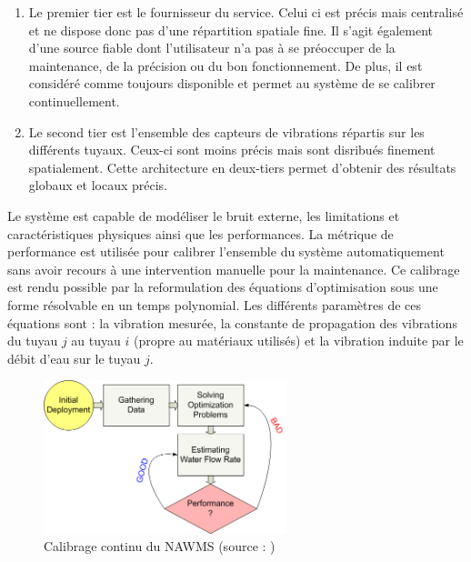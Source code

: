 \documentclass[10pt, article]{llncs}
\begin{document}
		\begin{enumerate}
			\item Le premier tier est le fournisseur du service. Celui ci est précis mais centralisé et ne dispose donc pas d'une répartition spatiale fine. Il s'agit également d'une source fiable dont l'utilisateur n'a pas à se préoccuper de la maintenance, de la précision ou du bon fonctionnement. De plus, il est considéré comme toujours disponible et permet au système de se calibrer continuellement.
			\item Le second tier est l'ensemble des capteurs de vibrations répartis sur les différents tuyaux. Ceux-ci sont moins précis mais sont disribués finement spatialement. Cette architecture en deux-tiers permet d'obtenir des résultats globaux et locaux précis.
		\end{enumerate}
		Le système est capable de modéliser le bruit externe, les limitations et caractéristiques physiques ainsi que les performances. La métrique de performance est utilisée pour calibrer l'ensemble du système automatiquement sans avoir recours à une intervention manuelle pour la maintenance. Ce calibrage est rendu possible par la reformulation des équations d'optimisation sous une forme résolvable en un temps polynomial. Les différents paramètres de ces équations sont : la vibration mesurée, la constante de propagation des vibrations du tuyau $j$ au tuyau $i$ (propre au matériaux utilisés) et la vibration induite par le débit d'eau sur le tuyau $j$.
		\begin{figure}
			\begin{center}
				\includegraphics[width=200pt]{img/nawms3.png}
			\end{center}
			\caption{Calibrage continu du NAWMS (source : \cite{kim_nawms:_2008})}
		\end{figure}
	
\end{document}
